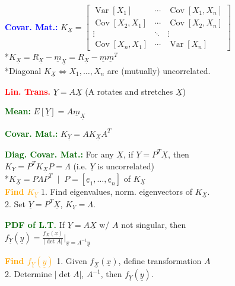 \documentclass[5pt]{extarticle} %
\begin{document}
\begin{paracol}{3}
{    \textcolor{blue}{\textbf{Covar. Mat.:}} $K_{\underline{X}} =
    \begin{bmatrix}
    \operatorname{Var}[X_1] & \cdots & \operatorname{Cov}[X_1, X_n] \\
    \operatorname{Cov}[X_2, X_1] & \cdots & \operatorname{Cov}[X_2, X_n] \\
    \vdots & \ddots & \vdots \\
    \operatorname{Cov}[X_n, X_1] & \cdots & \operatorname{Var}[X_n]
    \end{bmatrix}$ \\
    *$K_{\underline{X}} = R_{\underline{X}} - \underline{m}_{\underline{X}} = R_{\underline{X}} - \underline{m} \underline{m}^T$ \\
    *Diagonal $K_{\underline{X}} \iff X_1, \ldots, X_n$ are (mutually) uncorrelated.

    \textcolor{red}{\textbf{Lin. Trans.}} $\underline{Y} = A \underline{X}$ (A rotates and stretches $\underline{X}$)

    \textcolor{darkgreen}{\textbf{Mean:}} $E[\underline{Y}] = A \underline{m}_{\underline{X}}$

    \textcolor{darkgreen}{\textbf{Covar. Mat.:}} $K_{\underline{Y}} = A K_{\underline{X}} A^T$

    \textcolor{darkgreen}{\textbf{Diag. Covar. Mat.:}} For any $\underline{X}$, if $\underline{Y} = P^T \underline{X}$, then \\
    $K_{\underline{Y}} = P^T K_{\underline{X}} P = \Lambda$ (i.e. $\underline{Y}$ is uncorrelated) \\
    *$K_{\underline{X}} = P \Lambda P^T \; \mid \; P = [\underline{e}_1, \ldots, \underline{e}_n]$ of $K_{\underline{X}}$ \\

    \textcolor{orange}{\textbf{Find $K_{\underline{Y}}$}} 1. Find eigenvalues, norm. eigenvectors of $K_{\underline{X}}$. \\
    2. Set $\underline{Y} = P^T \underline{X}$, $K_{\underline{Y}} = \Lambda$.

    \textcolor{darkgreen}{\textbf{PDF of L.T.}} If $\underline{Y} = A \underline{X}$ w/ $A$ not singular, then \\
    $f_{\underline{Y}} (\underline{y}) = \frac{f_{\underline{X}} (\underline{x})}{|\det A|} \Big|_{\underline{x} = A^{-1} \underline{y}}$

    \textcolor{orange}{\textbf{Find $f_{\underline{Y}} (\underline{y})$}} 1. Given $f_{\underline{X}} (\underline{x})$, define transformation $A$ \\
    2. Determine $|\det A|$, $A^{-1}$, then $f_{\underline{Y}} (\underline{y})$.

}
\end{paracol}
\end{document}
